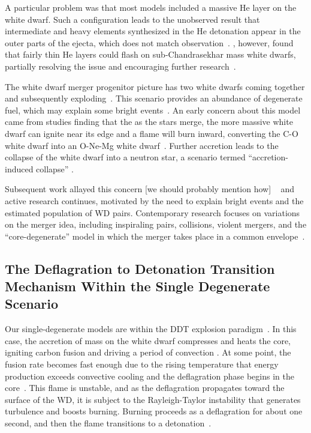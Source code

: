 \documentclass[iop,apj]{emulateapj}
\begin{document}
A particular problem was that most models included a massive He layer on
the white dwarf. Such a configuration leads to the unobserved result that
intermediate and heavy elements synthesized in the He detonation appear in
the outer parts of the ejecta, which does not match observation~\citep{HoefKhok96,
hoeflichetal96,finkhillebrandtroepke2007,simetal2010}.  \citet{bildstenetal2007},
however, found that fairly thin He layers could flash on sub-Chandrasekhar
mass white dwarfs, partially resolving the issue and encouraging
further research~\citep{simetal2012,brooksetal2015, shenetal2018,
glasneretal2018}.

The white dwarf merger progenitor picture has two white dwarfs coming
together and subsequently exploding~\citep{tutukovyungelson76,tutukovyungelson79,
webbink84,ibentutukov84}. This scenario provides an abundance of degenerate fuel,
which may explain some bright events~\citep{scalzo:2010,Yuan:2010}.
An early concern about this model came from studies finding that
the as the stars merge, the more massive white dwarf can ignite near
its edge and a flame will burn inward, converting the C-O white dwarf into
an O-Ne-Mg white dwarf~\citep{saionomoto1985,saionomoto2004}.  Further accretion
leads to the collapse of the white dwarf
into a neutron star, a scenario termed ``accretion-induced collapse''
\citep{nomotokondo1991}.

Subsequent work allayed this concern {\color{blue} [we should probably mention how]}
~\citep{yoonetal2007,lorenaguilaretal2009, Shenetal12, pakmoretal2012b}
and active research continues, motivated by the need to explain bright events
and the estimated population of WD pairs. Contemporary
research focuses on variations on the merger idea, including inspiraling pairs,
collisions, violent mergers, and the ``core-degenerate'' model in which the merger
takes place in a common envelope~\citep{raskinetal2009,pakmoretal2011,kashi:2011,
pakmoretal2012a,Shenetal12,katzetal2016}.


\subsection{The Deflagration to Detonation Transition Mechanism Within
the Single Degenerate Scenario}

Our single-degenerate models are within the DDT explosion paradigm~\citep{1986SvAL,
Khokhlov1991Delayed-detonat,NiemWoos97,Niem99,belletal2004,fishjump2015}.
In this case, the accretion of mass on the white dwarf compresses and
heats the core, igniting carbon fusion and driving a period of convection
\citep{WoosWunsKuhl04,wunschwoosley2004,Kuhletal06,nonakaetal2012}.
At some point, the fusion rate becomes fast enough due to the rising
temperature that energy production exceeds convective cooling and
the deflagration phase begins in the core~\citep{Nomo84,WoosWunsKuhl04}.
This flame is unstable, and as the deflagration propagates toward the surface
of the WD, it is subject to the Rayleigh-Taylor instability that generates
turbulence and boosts burning.
Burning proceeds as a deflagration for about one second, and then
the flame transitions to a detonation~\citep{hoflich.khokhlov.ea:delayed}.
\end{document}
